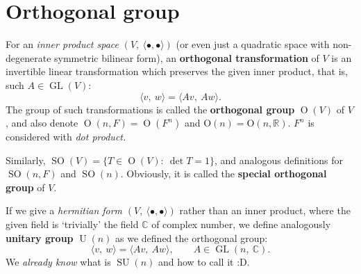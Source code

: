 \section{Orthogonal group}
\begin{defn}
For an \textit{inner product space} $(V,~\langle \bullet , \bullet \rangle)$ (or even just a quadratic space with non-degenerate symmetric bilinear form), an \textbf{orthogonal transformation} of $V$ is an invertible linear transformation which preserves the given inner product, that is, such $A\in \operatorname{GL}(V)$: $$\langle v, ~w \rangle = \langle Av,~ Aw \rangle.$$ The group of such transformations is called the \textbf{orthogonal group} $\operatorname{O}(V)$ of $V$, and also denote $\operatorname{O}(n, F) = \operatorname{O}(F^n)$ and $\mathrm O(n) = \mathrm O(n, \mathbb R)$. $F^n$ is considered with \textit{dot product.}

Similarly, $\operatorname{SO}(V) = \{T\in \operatorname{O}(V):~ \operatorname{det}T = 1\}$, and analogous definitions for $\operatorname{SO}(n,F)$ and $\operatorname{SO}(n).$ Obviously, it is called the \textbf{special orthogonal group} of $V$.
\end{defn}
\begin{defn}
If we give a \textit{hermitian form} $(V, ~ \langle \bullet, \bullet \rangle )$ rather than an inner product, where the given field is `trivially' the field $\mathbb C$ of complex number, we define analogously \textbf{unitary group} $\operatorname{U}(n)$ as we defined the orthogonal group:$$\langle v, ~w \rangle = \langle Av,~ Aw \rangle, \qquad A \in \operatorname{GL}(n,~\mathbb C).$$ We \textit{already know} what is $\operatorname{SU}(n)$ and how to call it \textsf{:D}.
\end{defn}

